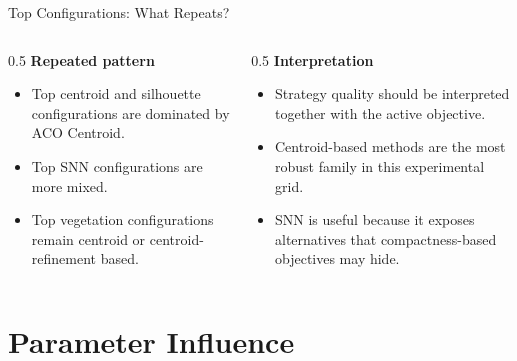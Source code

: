 \documentclass[aspectratio=169,10pt]{beamer}
\begin{document}
\begin{frame}{Top Configurations: What Repeats?}
  \begin{columns}[T]
    \begin{column}{0.5\textwidth}
      \textbf{Repeated pattern}
      \begin{itemize}
        \item Top centroid and silhouette configurations are dominated by ACO Centroid.
        \item Top SNN configurations are more mixed.
        \item Top vegetation configurations remain centroid or centroid-refinement based.
      \end{itemize}
    \end{column}
    \begin{column}{0.5\textwidth}
      \textbf{Interpretation}
      \begin{itemize}
        \item Strategy quality should be interpreted together with the active objective.
        \item Centroid-based methods are the most robust family in this experimental grid.
        \item SNN is useful because it exposes alternatives that compactness-based objectives may hide.
      \end{itemize}
    \end{column}
  \end{columns}
\end{frame}

\section{Parameter Influence}
\end{document}

